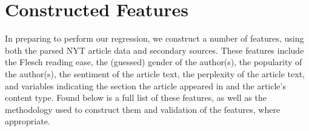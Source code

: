 \documentclass[fleqn,12pt]{SelfArx} %
\begin{document}


\section{Constructed Features}

In preparing to perform our regression, we construct a number of features, using both the parsed NYT article data and secondary sources. These features include the Flesch reading ease, the (guessed) gender of the author(s), the popularity of the author(s), the sentiment of the article text, the perplexity of the article text, and variables indicating the section the article appeared in and the article's content type. Found below is a full list of these features, as well as the methodology used to construct them and validation of the features, where appropriate.
\end{document}
